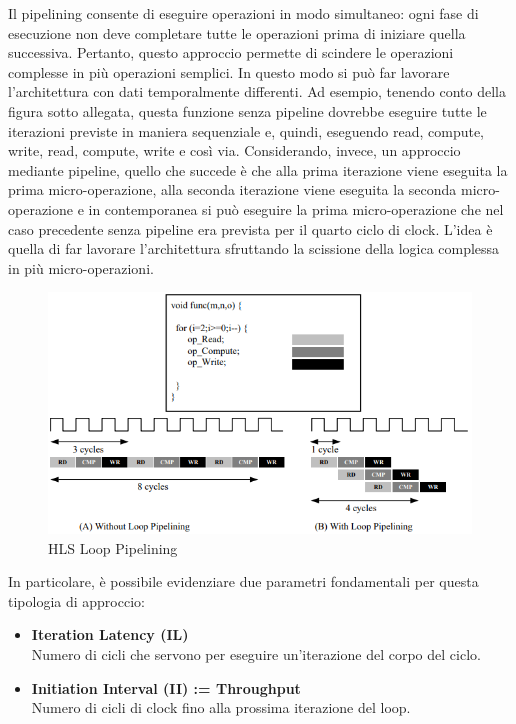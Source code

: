 Il pipelining consente di eseguire operazioni in modo simultaneo: ogni fase di esecuzione non deve completare tutte le operazioni prima di iniziare quella successiva. Pertanto, questo approccio permette di scindere le operazioni complesse in più operazioni semplici. In questo modo si può far lavorare l'architettura con dati temporalmente differenti. Ad esempio, tenendo conto della figura sotto allegata, questa funzione senza pipeline dovrebbe eseguire tutte le iterazioni previste in maniera sequenziale e, quindi, eseguendo read, compute, write, read, compute, write e così via. Considerando, invece, un approccio mediante pipeline, quello che succede è che alla prima iterazione viene eseguita la prima micro-operazione, alla seconda iterazione viene eseguita la seconda micro-operazione e in contemporanea si può eseguire la prima micro-operazione che nel caso precedente senza pipeline era prevista per il quarto ciclo di clock. L'idea è quella di far lavorare l'architettura sfruttando la scissione della logica complessa in più micro-operazioni. 

\begin{figure}[H]
    \centering
    \includegraphics[width=1\textwidth]{solutions/loop_pipelining/looppipelining.png}
    \caption{HLS Loop Pipelining}
\end{figure}

In particolare, è possibile evidenziare due parametri fondamentali per questa tipologia di approccio:
\begin{itemize}
    \item \textbf{Iteration Latency (IL)}\\
    Numero di cicli che servono per eseguire un'iterazione del corpo del ciclo.
    \item \textbf{Initiation Interval (II) := Throughput}\\
    Numero di cicli di clock fino alla prossima iterazione del loop.
\end{itemize}

